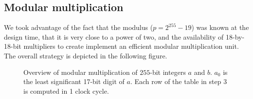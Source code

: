 \subsection{Modular multiplication}\label{modular-multiplication}

We took advantage of the fact that the modulus (\(p=2^{255}-19\)) was
known at the design time, that it is very close to a power of two, and
the availability of 18-by-18-bit multipliers to create implement an
efficient modular multiplication unit. The overall strategy is depicted
in the following figure.

\begin{figure}
\label{figFemul}
\centering \caption{Overview of modular multiplication of $255$-bit integers $a$
and $b$. $a_0$ is the least significant 17-bit digit of $a$. Each row of the
table in step 3 is computed in 1 clock cycle.}
%
\end{figure}

